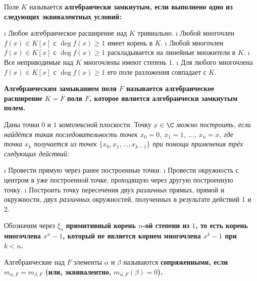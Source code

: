 \begin{defn}
Поле \(K\) называется \bf{алгебраически замкнутым}, если выполнено одно из следующих эквивалентных условий:

\begin{enumerate}
\def\labelenumi{(\arabic{enumi})}
\tightlist
\i
  Любое алгебраическое расширение над \(K\) тривиально.
\i
  Любой многочлен \(f(x) \in K[x]\) с \(\deg f(x) \geq 1\) имеет корень в \(K\).
\i
  Любой многочлен \(f(x) \in K[x]\) с \(\deg f(x) \geq 1\) раскладывается на линейные множители в \(K\).
\i
  Все неприводимые над \(K\) многочлены имеют степень \(1\).
\i
  Для любого многочлена \(f(x) \in K[x]\) с \(\deg f(x) \geq 1\) его поле разложения совпадает с \(K\).
\end{enumerate}

\end{defn}

\begin{defn}
\bf{Алгебраическим замыканием} поля \(F\) называется алгебраическое расширение \(K=\overline{F}\) поля \(F\), которое является алгебраически замкнутым полем.

\end{defn}

\begin{defn}
Даны точки \(0\) и \(1\) комплексной плоскости. Точку \(x \in \C\) \it{можно построить}, если найдётся такая последовательность точек \(x_0=0\), \(x_1=1\), \(\ldots\), \(x_n=x\), где точка \(x_k\) получается из точек \(\{x_0,x_1,\ldots, x_{k-1}\}\) при помощи применения трёх следующих действий:

\begin{enumerate}
\def\labelenumi{\arabic{enumi}.}
\tightlist
\i
  Провести прямую через ранее построенные точки.
\i
  Провести окружность с центром в уже построенной точке, проходящую через другую построенную точку.
\i
  Построить точку пересечения двух \emph{различных} прямых, прямой и окружности, двух \emph{различных} окружностей, полученных в результате действий 1 и 2.
\end{enumerate}

\end{defn}

\begin{defn}
Обозначим через \(\xi_n\) \bf{примитивный корень} \(n\)-ой степени из \(1\), то есть корень многочлена \(x^n-1\), который не является корнем многочлена \(x^k-1\) при \(k<n\).
\end{defn}

\begin{defn}
Алгебраические над \(F\) элементы \(\alpha\) и \(\beta\) называются \bf{сопряженными}, если \(m_{\alpha,F} = m_{\beta,F}\) (или, эквивалентно, \(m_{\alpha,F}(\beta)=0\)).
\end{defn}

